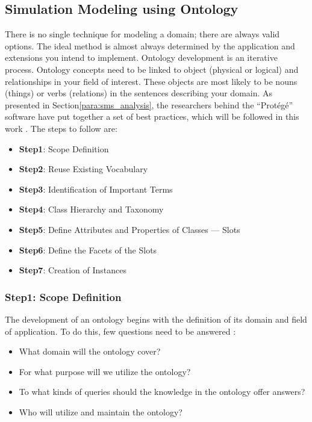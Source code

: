 \subsection{Simulation Modeling using Ontology}
There is no single technique for modeling a domain; there are always valid options. The ideal method is almost always determined by the application and extensions you intend to implement. Ontology development is an iterative process. Ontology concepts need to be linked to object (physical or logical) and relationships in your field of interest. These objects are most likely to be nouns (things) or verbs (relations) in the sentences describing your domain. As presented in Section\ref{para:sms_analysis}, the researchers behind the “Protégé” software have put together a set of best practices, which will be followed in this work \cite{noy2001ontology}. The steps to follow are:

\begin{itemize}
    \item \textbf{Step1}: Scope Definition
    \item \textbf{Step2}: Reuse Existing Vocabulary
    \item \textbf{Step3}: Identification of Important Terms
    \item \textbf{Step4}: Class Hierarchy and Taxonomy
    \item \textbf{Step5}: Define Attributes and Properties of Classes — Slots
    \item \textbf{Step6}: Define the Facets of the Slots
    \item \textbf{Step7}: Creation of Instances
\end{itemize}

    \subsubsection{Step1: Scope Definition}
    The development of an ontology begins with the definition of its domain and field of application. To do this, few questions need to be answered \cite{noy2001ontology}:
    
    \begin{itemize}
        \item What domain will the ontology cover? 
        \item For what purpose will we utilize the ontology? 
        \item To what kinds of queries should the knowledge in the ontology offer answers? 
        \item Who will utilize and maintain the ontology?
    \end{itemize}
    
